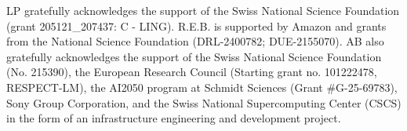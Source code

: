 LP gratefully acknowledges the support of the Swiss National Science Foundation (grant 205121\_207437: C - LING). R.E.B. is supported by Amazon and grants from the National Science Foundation (DRL-2400782; DUE-2155070). AB also gratefully acknowledges the support of the Swiss National Science Foundation (No. 215390), the European Research Council (Starting grant no. 101222478, RESPECT-LM), the AI2050 program at Schmidt Sciences (Grant \#G-25-69783), Sony Group Corporation, and the Swiss National Supercomputing Center (CSCS) in the form of an infrastructure engineering and development project. 